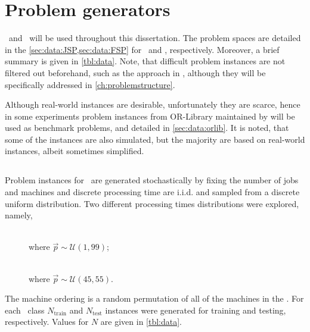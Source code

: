
\chapter{Problem generators}\label{ch:genprobleminstances} 

 \JSP\ and \FSP\  will be used  throughout this dissertation. The  problem spaces are detailed in the \cref{sec:data:JSP,sec:data:FSP} for \JSP\ and \FSP, respectively. Moreover, a brief summary is given in \cref{tbl:data}.
Note, that difficult problem instances are not filtered out beforehand, such as the approach in \citet{Whitley}, although they will be specifically addressed in \cref{ch:problemstructure}. 

Although real-world instances are desirable, unfortunately they are scarce, hence in some experiments problem instances from OR-Library maintained by \citet{ORlibrary} will be used as benchmark problems, and detailed in \cref{sec:data:orlib}. It is noted, that some of the instances are also simulated, but the majority are based on real-world instances, albeit sometimes simplified. 

\section{\Jsp}\label{sec:data:JSP}
Problem instances for \JSP\ are generated stochastically by fixing the number of jobs and machines and 
discrete processing time are i.i.d. and sampled from a discrete uniform distribution. %
Two different processing times distributions were explored, namely,
\begin{description}
\item[\Jrnd]  \hfill \\ where $\vec{p}\sim\mathcal{U}(1,99)$;
\item[\Jrndn]  \hfill \\ where $\vec{p}\sim\mathcal{U}(45,55)$.
\end{description}
The machine ordering is a random permutation of all of the machines in the \jsp. 
For each \JSP\ class $N_{\text{train}}$  and $N_{\text{test}}$ instances were generated for training and testing, respectively. Values for $N$ are given in \cref{tbl:data}. 

